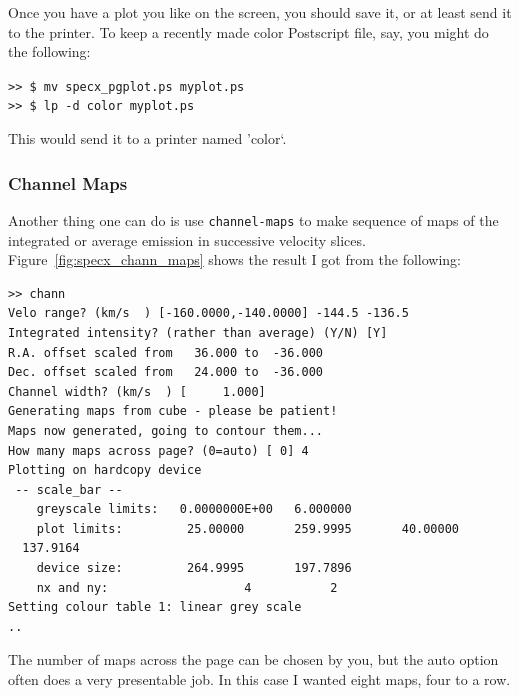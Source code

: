 \documentclass[11pt,twoside]{article}
\begin{document}
Once you have a plot you like on the screen, you should save it, or at
least send it to the printer. To keep a recently made color Postscript
file, say, you might do the following:

\verb|>> $ mv specx_pgplot.ps myplot.ps|\\
\verb|>> $ lp -d color myplot.ps|

This would send it to a printer named 'color`.

\subsubsection{Channel Maps}
\label{sec:specx_13.5}
Another thing one can do is use {\tt channel-maps} to make sequence of
maps of the integrated or average emission in successive velocity
slices.  Figure~\ref{fig:specx_chann_maps} shows the result I got from
the following:

\begin{verbatim}
>> chann
Velo range? (km/s  ) [-160.0000,-140.0000] -144.5 -136.5
Integrated intensity? (rather than average) (Y/N) [Y]
R.A. offset scaled from   36.000 to  -36.000
Dec. offset scaled from   24.000 to  -36.000
Channel width? (km/s  ) [     1.000]
Generating maps from cube - please be patient!
Maps now generated, going to contour them...
How many maps across page? (0=auto) [ 0] 4
Plotting on hardcopy device
 -- scale_bar --
    greyscale limits:   0.0000000E+00   6.000000
    plot limits:         25.00000       259.9995       40.00000
  137.9164
    device size:         264.9995       197.7896
    nx and ny:                   4           2
Setting colour table 1: linear grey scale
..
\end{verbatim}

The number of maps across the page can be chosen by you, but the auto
option often does a very presentable job. In this case I wanted eight
maps, four to a row.
\end{document}
